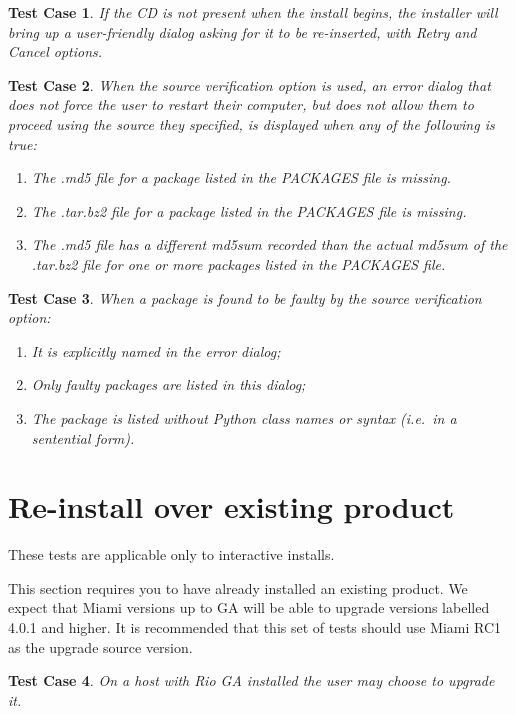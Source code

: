 \documentclass[a4paper]{article}
\newtheorem{testcase}{Test Case}
\begin{document}
\begin{testcase}
If the CD is not present when the install begins, the installer will
bring up a user-friendly dialog asking for it to be re-inserted, with
Retry and Cancel options.
\end{testcase}

\begin{testcase}
When the source verification option is used, an error dialog that does
not force the user to restart their computer, but does not allow them
to proceed using the source they specified, is displayed when any of
the following is true:
\begin{enumerate}
\item The .md5 file for a package listed in the PACKAGES file is
  missing.
\item The .tar.bz2 file for a package listed in the PACKAGES file is
  missing.
\item The .md5 file has a different md5sum recorded than the actual
  md5sum of the .tar.bz2 file for one or more packages listed in the
  PACKAGES file.
\end{enumerate}
\end{testcase}

\begin{testcase}
When a package is found to be faulty by the source verification
option:
\begin{enumerate}
\item It is explicitly named in the error dialog;
\item Only faulty packages are listed in this dialog;
\item The package is listed without Python class names or syntax
(i.e.\ in a sentential form).
\end{enumerate}
\end{testcase}

\section{Re-install over existing product}

These tests are applicable only to interactive installs.

This section requires you to have already installed an existing
product.  We expect that Miami versions up to GA will be able to
upgrade versions labelled 4.0.1 and higher.  It is recommended that
this set of tests should use Miami RC1 as the upgrade source version.

\begin{testcase}
On a host with Rio GA installed the user may choose to upgrade it.
\end{testcase}
\end{document}
